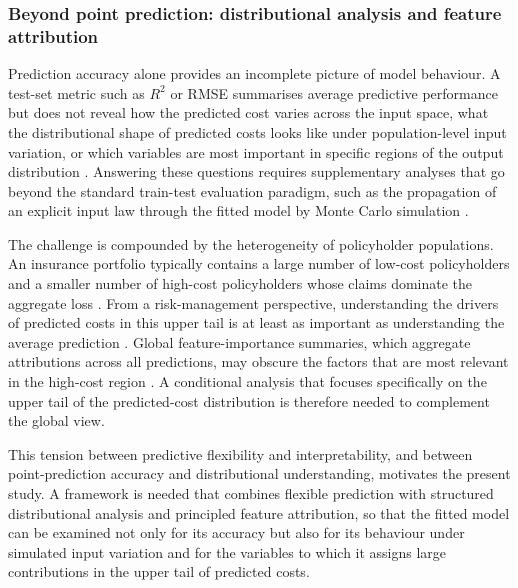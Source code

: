 \subsubsection{Beyond point prediction: distributional analysis and
feature attribution}
\label{sec:beyond_point_prediction}

Prediction accuracy alone provides an incomplete picture of model
behaviour.  A test-set metric such as \ensuremath{R^2} or RMSE summarises average
predictive performance but does not reveal how the predicted cost varies
across the input space, what the distributional shape of predicted costs
looks like under population-level input variation, or which variables are
most important in specific regions of the output distribution
\citep{molnar2022interpretable, duncan2016testing}.  Answering
these questions requires supplementary analyses that go beyond the
standard train-test evaluation paradigm, such as the propagation of an
explicit input law through the fitted model by Monte Carlo simulation
\citep{glasserman2004monte, saltelli2002making}.

The challenge is compounded by the heterogeneity of policyholder
populations.  An insurance portfolio typically contains a large number of
low-cost policyholders and a smaller number of high-cost policyholders
whose claims dominate the aggregate loss
\citep{embrechts1997modelling, denuit2007actuarial, bertsimas2008algorithmic}.
From a risk-management
perspective, understanding the drivers of predicted costs in this upper
tail is at least as important as understanding the average prediction
\citep{mcneil2015quantitative, coles2001introduction}.
Global feature-importance summaries, which aggregate attributions across
all predictions, may obscure the factors that are most relevant in the
high-cost region \citep{lundberg2020local, ribeiro2016should, covert2021explaining}.
A conditional analysis that focuses specifically on
the upper tail of the predicted-cost distribution is therefore needed
to complement the global view.

This tension between predictive flexibility and interpretability, and
between point-prediction accuracy and distributional understanding,
motivates the present study.  A framework is needed that combines
flexible prediction with structured distributional analysis and
principled feature attribution, so that the fitted model can be
examined not only for its accuracy but also for its behaviour under
simulated input variation and for the variables to which it assigns
large contributions in the upper tail of predicted costs.

